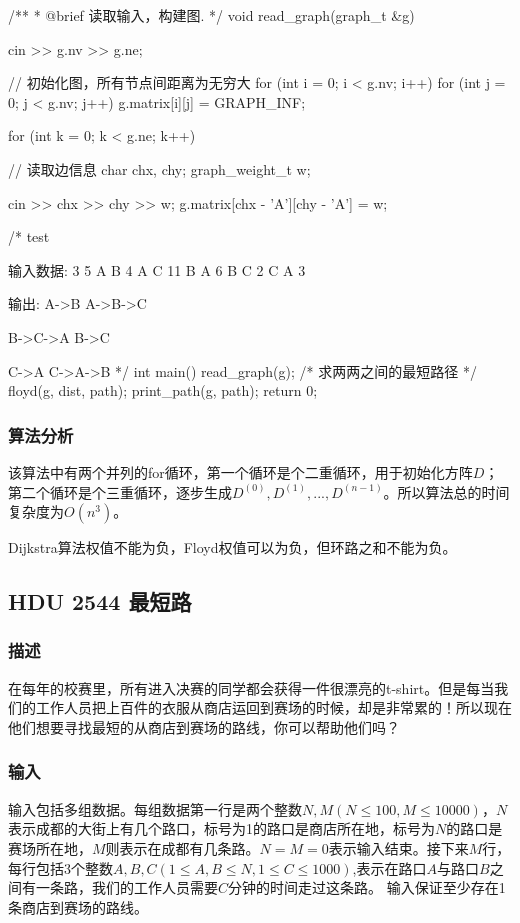 \begin{Codex}[label=am_graph_floyd.cpp]
/**
 * @brief 读取输入，构建图.
 */
void read_graph(graph_t &g) {
    cin >> g.nv >> g.ne;

    // 初始化图，所有节点间距离为无穷大
    for (int i = 0; i < g.nv; i++) {
        for (int j = 0; j < g.nv; j++) {
            g.matrix[i][j] = GRAPH_INF;
        }
    }

    for (int k = 0; k < g.ne; k++) { // 读取边信息
        char chx, chy;
        graph_weight_t w;

        cin >> chx >> chy >> w;
        g.matrix[chx - 'A'][chy - 'A'] = w;
    }
}

/* test

输入数据:
3 5
A B 4
A C 11
B A 6
B C 2
C A 3

输出:
A->B
A->B->C

B->C->A
B->C

C->A
C->A->B
*/
int main() {
    read_graph(g);
    /* 求两两之间的最短路径 */
    floyd(g, dist, path);
    print_path(g, path);
    return 0;
}
\end{Codex}

\subsubsection{算法分析}
该算法中有两个并列的for循环，第一个循环是个二重循环，用于初始化方阵$D$；第二个循环是个三重循环，逐步生成$D^{(0)}, D^{(1)} ,...,D^{(n-1)}$。所以算法总的时间复杂度为$O(n^3)$。

Dijkstra算法权值不能为负，Floyd权值可以为负，但环路之和不能为负。


\subsection{HDU 2544 最短路}
\subsubsection{描述}
在每年的校赛里，所有进入决赛的同学都会获得一件很漂亮的t-shirt。但是每当我们的工作人员把上百件的衣服从商店运回到赛场的时候，却是非常累的！所以现在他们想要寻找最短的从商店到赛场的路线，你可以帮助他们吗？

\subsubsection{输入}
输入包括多组数据。每组数据第一行是两个整数$N,M(N \leq 100,M \leq 10000)$，$N$表示成都的大街上有几个路口，标号为1的路口是商店所在地，标号为$N$的路口是赛场所在地，$M$则表示在成都有几条路。$N=M=0$表示输入结束。接下来$M$行，每行包括3个整数$A,B,C(1 \leq A,B \leq N,1 \leq C \leq 1000)$,表示在路口$A$与路口$B$之间有一条路，我们的工作人员需要$C$分钟的时间走过这条路。
输入保证至少存在1条商店到赛场的路线。


